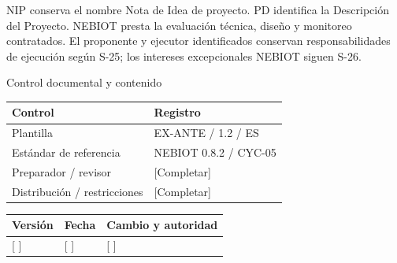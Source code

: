 \vspace{2mm}
NIP conserva el nombre Nota de Idea de proyecto. PD identifica la Descripción del Proyecto.
\vspace{2mm}
NEBIOT presta la evaluación técnica, diseño y monitoreo contratados. El proponente y ejecutor identificados conservan responsabilidades de ejecución según S-25; los intereses excepcionales NEBIOT siguen S-26.
\clearpage
{\fontsize{23}{27}\selectfont\color{NEBGreen}Control documental y contenido\par}
\vspace{3mm}
{\sffamily\fontsize{8.3}{10.3}\selectfont\begin{longtable}{@{}P{50.55mm} P{117.94mm}@{}}
\toprule
\textbf{Control} & \textbf{Registro}\\\midrule\endhead
\rule{0pt}{7.7mm}Plantilla & EX-ANTE / 1.2 / ES\\\hline
\rule{0pt}{7.7mm}Estándar de referencia & NEBIOT 0.8.2 / CYC-05\\\hline
\rule{0pt}{7.7mm}Preparador / revisor & [Completar]\\\hline
\rule{0pt}{7.7mm}Distribución / restricciones & [Completar]\\\hline
\end{longtable}}
{\sffamily\fontsize{8.3}{10.3}\selectfont\begin{longtable}{@{}P{31.34mm} P{37.94mm} P{95.68mm}@{}}
\toprule
\textbf{Versión} & \textbf{Fecha} & \textbf{Cambio y autoridad}\\\midrule\endhead
\rule{0pt}{7.7mm}[ ] & [ ] & [ ]\\\hline
\end{longtable}}
{\sffamily\fontsize{9.5}{11.4}\selectfont\tableofcontents}

